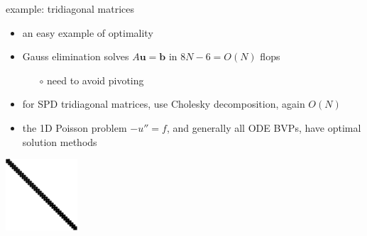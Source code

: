\documentclass[hide notes,intlimits,usenames,dvipsnames]{beamer}
\newcommand{\bb}{\mathbf{b}}
\newcommand{\bu}{\mathbf{u}}
\begin{document}
\begin{frame}{example: tridiagonal matrices}
\begin{itemize}
\item an easy example of optimality
\item Gauss elimination solves $A \bu = \bb$ in $8N-6=O(N)$ flops
	\begin{itemize}
	\item[$\circ$] need to avoid pivoting
	\end{itemize}
\item for SPD tridiagonal matrices, use Cholesky decomposition, again $O(N)$
\item the 1D Poisson problem $-u''=f$, and generally all ODE BVPs, have optimal solution methods
\end{itemize}

\bigskip
\begin{center}
\includegraphics[width=0.2\textwidth]{figs/spytri}
\end{center}
\end{frame}
\end{document}
